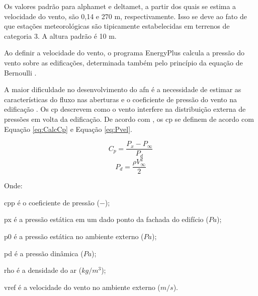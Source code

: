 \begin{table}[h]
{\begin{tabular}{|c |c |c |c | }
		\end{tabular}
	}
\end{table}

Os valores padrão para \gls{alphamet} e \gls{deltamet}, a partir dos quais se estima a velocidade do vento, são 0,14 e 270 m, respectivamente. Isso se deve ao fato de que estações meteorológicas são tipicamente estabelecidas em terrenos de categoria 3. A altura padrão é 10 m. 

Ao definir a velocidade do vento, o programa EnergyPlus calcula a pressão do vento sobre as edificações, determinada também pelo princípio da equação de Bernoulli \cite{Walton1989}.

A maior dificuldade no desenvolvimento do \acrshort{afn} é a necessidade de estimar as características do fluxo nas aberturas e o coeficiente de pressão do vento na edificação \cite{Arendt2017}. Os \acrfull{cp} descrevem como o vento interfere na distribuição externa de pressões em volta da edificação. 
De acordo com , os \acrshort{cp} se definem de acordo com Equação \ref{eq:CalcCp} e Equação \ref{eq:Pvel}.

\begin{equation}\label{eq:CalcCp}
C_p = \frac{P_x - P_{\infty}}{P_d}
\end{equation}
\begin{equation}\label{eq:Pvel}
P_d = \frac{\rho V^{2}_{\infty}}{2}
\end{equation}

Onde:

\gls{cpp} é o coeficiente de pressão ($-$);

\gls{px} é a pressão estática em um dado ponto da fachada do edifício ($Pa$);

\gls{p0} é a pressão estática no ambiente externo ($Pa$);

\gls{pd} é a pressão dinâmica ($Pa$);

\gls{rho} é a densidade do ar ($kg/m^3$);

\gls{vref} é a velocidade do vento no ambiente externo ($m/s$).
\\

